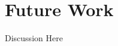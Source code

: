 \documentclass[]{elsarticle}
\theoremstyle{definition}
\theoremstyle{remark}
\begin{document}
%
%



\section{Future Work}
Discussion Here
\end{document}
